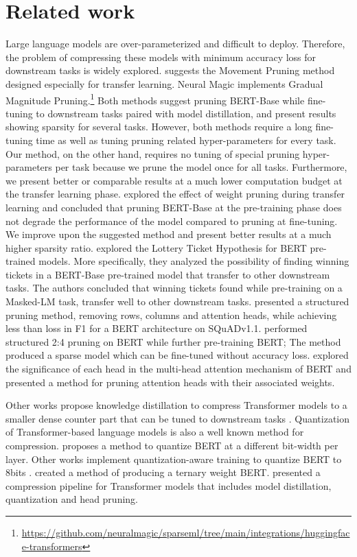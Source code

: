 \documentclass{article}
\begin{document}
\section{Related work}
\label{sec:related}
Large language models are over-parameterized and difficult to deploy. Therefore, the problem of compressing these models with minimum accuracy loss for downstream tasks is widely explored. 
\citet{sanh2020movement} suggests the Movement Pruning method designed especially for transfer learning.
Neural Magic implements Gradual Magnitude Pruning.\footnote{\url{https://github.com/neuralmagic/sparseml/tree/main/integrations/huggingface-transformers}}
Both methods suggest pruning BERT-Base while fine-tuning to downstream tasks paired with model distillation, and present results showing  sparsity for several tasks.
However, both methods require a long fine-tuning time as well as tuning pruning related hyper-parameters for every task. 
Our method, on the other hand, requires no tuning of special pruning hyper-parameters  per task because we prune the model once for all tasks.
Furthermore, we present better or comparable results at a much lower computation budget at the transfer learning phase.
\citet{gordon2020pre-train} explored the effect of weight pruning during transfer learning and concluded that pruning BERT-Base at the pre-training phase does not degrade the performance of the model compared to pruning at fine-tuning.
We improve upon the suggested method and present better results at a much higher sparsity ratio.
\citet{chen2020lottery} explored the Lottery Ticket Hypothesis \citep{frankle2018lth} for BERT pre-trained models.
More specifically, they analyzed the possibility of finding winning tickets in a BERT-Base pre-trained model that transfer to other downstream tasks.
The authors concluded that winning tickets found while pre-training on a Masked-LM task, transfer well to other downstream tasks.
\citet{lagunas2021block} presented a structured pruning method, removing rows, columns and attention heads, while achieving less than  loss in F1 for a BERT architecture on SQuADv1.1.
\citet{mishra2021nvidia-pre-train} performed structured 2:4 pruning on BERT while further pre-training BERT;
The method produced a  sparse model which can be fine-tuned without accuracy loss.
\citet{michel2019heads} explored the significance of each head in the multi-head attention mechanism of BERT and presented a method for pruning attention heads with their associated weights.

Other works propose knowledge distillation to compress Transformer models to a smaller dense counter part that can be tuned to downstream tasks \citep{sanh2019distilbert, jiao2019tinybert, sun2020mobilebert}.
Quantization of Transformer-based language models is also a well known method for compression.
\citet{shen2020qbert} proposes a method to quantize BERT at a different bit-width per layer.
Other works implement quantization-aware training to quantize BERT to 8bits \citep{kim2021ibert, zafrir2019q8bert}.
\citet{zhang2020ternarybert} created a method of producing a ternary weight BERT.
\citet{kim2020fastformers} presented a compression pipeline for Transformer models that includes model distillation, quantization and head pruning.
\end{document}
